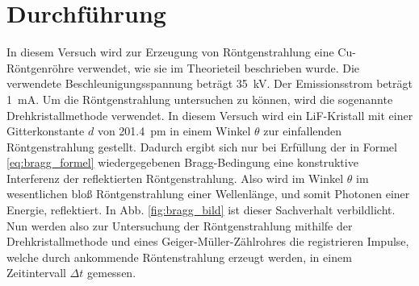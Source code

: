 
\section{Durchführung}
%
In diesem Versuch wird zur Erzeugung von Röntgenstrahlung eine
Cu-Röntgenröhre verwendet, wie sie im Theorieteil beschrieben wurde. Die
verwendete Beschleunigungsspannung beträgt \SI{35}{\kilo\volt}. Der
Emissionsstrom beträgt \SI{1}{\milli\ampere}.  Um die Röntgenstrahlung
untersuchen zu können, wird die sogenannte Drehkristallmethode
verwendet. In diesem Versuch wird ein LiF-Kristall mit einer
Gitterkonstante $d$ von \SI{201.4}{\pico\metre} in einem Winkel $\theta$
zur einfallenden Röntgenstrahlung gestellt. Dadurch ergibt sich nur bei
Erfüllung der in Formel \eqref{eq:bragg_formel} wiedergegebenen
Bragg-Bedingung eine konstruktive Interferenz der reflektierten
Röntgenstrahlung. Also wird im Winkel $\theta$ im wesentlichen bloß
Röntgenstrahlung einer Wellenlänge, und somit Photonen einer Energie,
reflektiert. In Abb. \ref{fig:bragg_bild} ist dieser Sachverhalt
verbildlicht.  Nun werden also zur Untersuchung der Röntgenstrahlung
mithilfe der Drehkristallmethode und eines Geiger-Müller-Zählrohres die
registrieren Impulse, welche durch ankommende Röntenstrahlung erzeugt
werden, in einem Zeitintervall $\Delta t$ gemessen.

